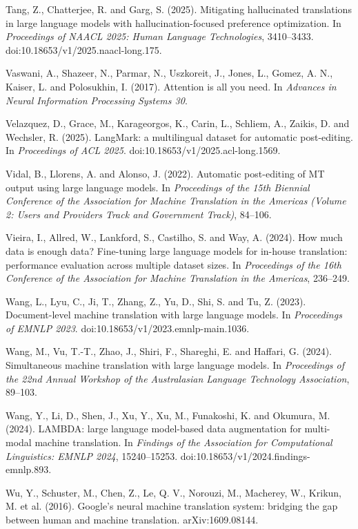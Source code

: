\documentclass[11pt]{article}
\begin{document}
Tang, Z., Chatterjee, R. and Garg, S. (2025). Mitigating hallucinated translations in large language models with hallucination-focused preference optimization. In \emph{Proceedings of NAACL 2025: Human Language Technologies}, 3410--3433. doi:10.18653/v1/2025.naacl-long.175.

Vaswani, A., Shazeer, N., Parmar, N., Uszkoreit, J., Jones, L., Gomez, A. N., Kaiser, L. and Polosukhin, I. (2017). Attention is all you need. In \emph{Advances in Neural Information Processing Systems 30}.

Velazquez, D., Grace, M., Karageorgos, K., Carin, L., Schliem, A., Zaikis, D. and Wechsler, R. (2025). LangMark: a multilingual dataset for automatic post-editing. In \emph{Proceedings of ACL 2025}. doi:10.18653/v1/2025.acl-long.1569.

Vidal, B., Llorens, A. and Alonso, J. (2022). Automatic post-editing of MT output using large language models. In \emph{Proceedings of the 15th Biennial Conference of the Association for Machine Translation in the Americas (Volume 2: Users and Providers Track and Government Track)}, 84--106.

Vieira, I., Allred, W., Lankford, S., Castilho, S. and Way, A. (2024). How much data is enough data? Fine-tuning large language models for in-house translation: performance evaluation across multiple dataset sizes. In \emph{Proceedings of the 16th Conference of the Association for Machine Translation in the Americas}, 236--249.

Wang, L., Lyu, C., Ji, T., Zhang, Z., Yu, D., Shi, S. and Tu, Z. (2023). Document-level machine translation with large language models. In \emph{Proceedings of EMNLP 2023}. doi:10.18653/v1/2023.emnlp-main.1036.

Wang, M., Vu, T.-T., Zhao, J., Shiri, F., Shareghi, E. and Haffari, G. (2024). Simultaneous machine translation with large language models. In \emph{Proceedings of the 22nd Annual Workshop of the Australasian Language Technology Association}, 89--103.

Wang, Y., Li, D., Shen, J., Xu, Y., Xu, M., Funakoshi, K. and Okumura, M. (2024). LAMBDA: large language model-based data augmentation for multi-modal machine translation. In \emph{Findings of the Association for Computational Linguistics: EMNLP 2024}, 15240--15253. doi:10.18653/v1/2024.findings-emnlp.893.

Wu, Y., Schuster, M., Chen, Z., Le, Q. V., Norouzi, M., Macherey, W., Krikun, M. et al. (2016). Google's neural machine translation system: bridging the gap between human and machine translation. arXiv:1609.08144.
\end{document}
